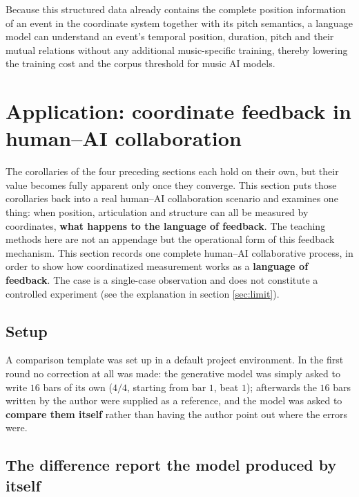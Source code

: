 \documentclass[11pt,a4paper]{article}
\begin{document}
Because this structured data already contains the complete position information of an
event in the coordinate system together with its pitch semantics, a language model can
understand an event's temporal position, duration, pitch and their mutual relations
without any additional music-specific training, thereby lowering the training cost and
the corpus threshold for music AI models.

\section{Application: coordinate feedback in human--AI collaboration}
\label{sec:collab}
\label{sec:case}

The corollaries of the four preceding sections each hold on their own, but their value
becomes fully apparent only once they converge. This section puts those corollaries back
into a real human--AI collaboration scenario and examines one thing: when position,
articulation and structure can all be measured by coordinates, \textbf{what happens to
the language of feedback}. The teaching methods here are not an appendage but the
operational form of this feedback mechanism.
This section records one complete human--AI collaborative process, in order to show how
coordinatized measurement works as a \textbf{language of feedback}. The case is a
single-case observation and does not constitute a controlled experiment (see the
explanation in section \ref{sec:limit}).

\subsection{Setup}

A comparison template was set up in a default project environment. In the first round no
correction at all was made: the generative model was simply asked to write $16$ bars of
its own ($4/4$, starting from bar $1$, beat $1$); afterwards the $16$ bars written by
the author were supplied as a reference, and the model was asked to \textbf{compare them
itself} rather than having the author point out where the errors were.

\subsection{The difference report the model produced by itself}
\end{document}
